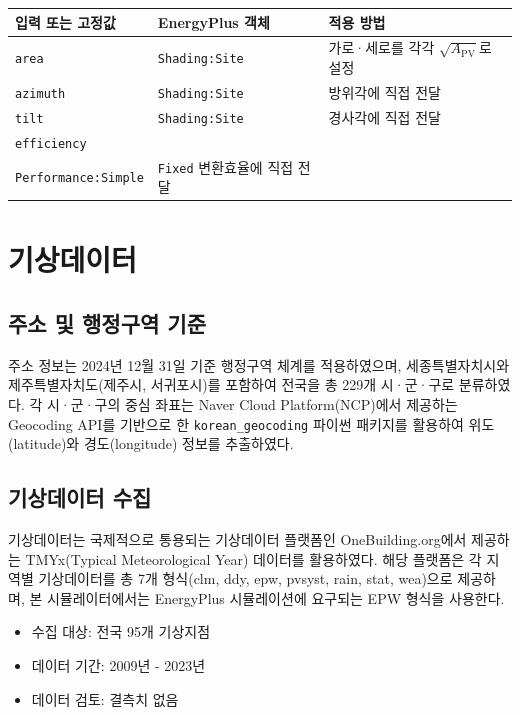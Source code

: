 \begin{defaulttable}
  \caption{PV 입력값과 EnergyPlus 객체 필드의 대응}
  \label{tab:pv-input-mapping}
  \footnotesize
  \begin{tabularx}{\textwidth}{>{\raggedright\arraybackslash}p{2.65cm}>{\raggedright\arraybackslash}p{4.35cm}X}
    \toprule
    입력 또는 고정값 & EnergyPlus 객체 & 적용 방법 \\ \midrule
    \texttt{area} & \texttt{Shading:Site} & 가로·세로를 각각 $\sqrt{A_{\mathrm{PV}}}$로 설정 \\
    \texttt{azimuth} & \texttt{Shading:Site} & 방위각에 직접 전달 \\
    \texttt{tilt} & \texttt{Shading:Site} & 경사각에 직접 전달 \\
    \texttt{efficiency} & \makecell[l]{\texttt{Photovoltaic}\\\texttt{Performance:Simple}} & \texttt{Fixed} 변환효율에 직접 전달 \\  \bottomrule
  \end{tabularx}
\end{defaulttable}


\section{기상데이터} \label{section:weather-data}
\subsection{주소 및 행정구역 기준}
주소 정보는 2024년 12월 31일 기준 행정구역 체계를 적용하였으며, 세종특별자치시와 제주특별자치도(제주시, 서귀포시)를 포함하여 전국을 총 229개 시·군·구로 분류하였다.
각 시·군·구의 중심 좌표는 Naver Cloud Platform(NCP)에서 제공하는 Geocoding API를 기반으로 한 \texttt{korean\_geocoding} 파이썬 패키지를 활용하여 위도(latitude)와 경도(longitude) 정보를 추출하였다.

\subsection{기상데이터 수집}
기상데이터는 국제적으로 통용되는 기상데이터 플랫폼인 OneBuilding.org\cite{onebuilding2025}에서 제공하는 TMYx(Typical Meteorological Year) 데이터를 활용하였다. 해당 플랫폼은 각 지역별 기상데이터를 총 7개 형식(clm, ddy, epw, pvsyst, rain, stat, wea)으로 제공하며, 본 시뮬레이터에서는 EnergyPlus 시뮬레이션에 요구되는 EPW 형식을 사용한다.
\begin{itemize}
  \item 수집 대상: 전국 95개 기상지점
  \item 데이터 기간: 2009년 - 2023년
  \item 데이터 검토: 결측치 없음
\end{itemize}
